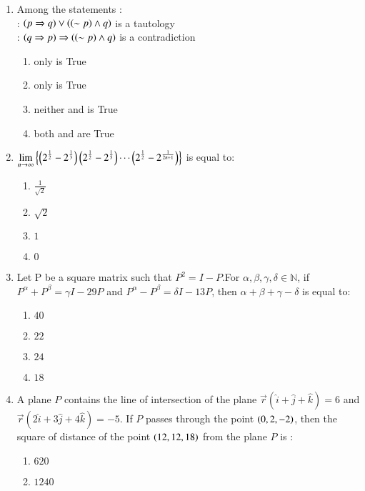 \documentclass[journal,12pt,onecolumn]{IEEEtran}
\theoremstyle{remark}
\begin{document}
\begin{enumerate}
\item Among the statements : \\      
	: $\left(p \Rightarrow q\right) \vee \left(\left(\sim p\right)\wedge q\right)$ is a tautology\\
		: $\left(q \Rightarrow p\right) \Rightarrow \left(\left(\sim p\right)\wedge q\right)$ is a contradiction
    \begin{enumerate}
	    \item only  is True
	    \item only  is True
	    \item neither  and  is True
	    \item both  and  are True
    \end{enumerate}
    \item $\displaystyle \lim_{n \to \infty} \left\{ \left( 2^{\frac{1}{2}} -2^{\frac{1}{3}}\right) \left(2^{\frac{1}{2}} - 2^{\frac{1}{5}} \right) \cdots \left(2^{\frac{1}{2}} - 2^{\frac{1}{2n+1}}\right)\right\}$ is equal to:
    \begin{enumerate}
        \item $\frac{1}{\sqrt{2}}$
        \item $\sqrt{2}$
        \item $1$
        \item $0$
    \end{enumerate}
    \item Let P be a square matrix such that $P^2 = I-P$.For $\alpha , \beta, \gamma, \delta \in \mathbb{N}$, if  $P^{\alpha}+P^{\beta}=\gamma I-29 P$ and $P^{\alpha}-P^{\beta}=\delta I-13P$, then $\alpha +\beta+ \gamma-\delta$ is equal to: \begin{enumerate}
        \item $40$    
 \item $22$    
        \item $24$     
        \item $18$     
    \end{enumerate}    
   \item A plane $P$ contains the line of intersection of the plane $ \overrightarrow{r} ( \hat {i} + \hat{j} + \hat{k}) = 6$ and $\overrightarrow{r} (2\hat {i} + 3\hat{j} + 4\hat{k}) = -5 $. If  $P$ passes through the point  $\left(0, 2, -2\right)$, then the square of distance of the point $\left(12, 12, 18\right)$ from the plane $P$ is :
\begin{enumerate}
        \item $620$                   
        \item $1240$          

\end{enumerate}
\end{enumerate}
\end{document}
